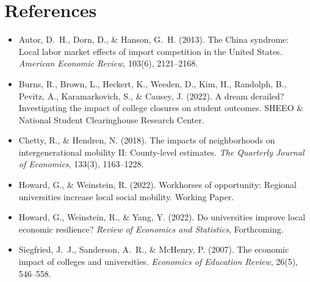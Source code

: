 \documentclass[12pt]{article}
\begin{document}
\section*{References}
\begin{itemize}
\item[] Autor, D.~H., Dorn, D., \& Hanson, G.~H. (2013).
The China syndrome: Local labor market effects of import competition in the United States.
\textit{American Economic Review}, 103(6), 2121--2168.

\item[] Burns, R., Brown, L., Heckert, K., Weeden, D., Kim, H., Randolph, B., Pevitz, A., Karamarkovich, S., \& Causey, J. (2022).
A dream derailed? Investigating the impact of college closures on student outcomes.
SHEEO \& National Student Clearinghouse Research Center.

\item[] Chetty, R., \& Hendren, N. (2018).
The impacts of neighborhoods on intergenerational mobility II: County-level estimates.
\textit{The Quarterly Journal of Economics}, 133(3), 1163--1228.

\item[] Howard, G., \& Weinstein, R. (2022).
Workhorses of opportunity: Regional universities increase local social mobility.
Working Paper.

\item[] Howard, G., Weinstein, R., \& Yang, Y. (2022).
Do universities improve local economic resilience?
\textit{Review of Economics and Statistics}, Forthcoming.

\item[] Siegfried, J.~J., Sanderson, A.~R., \& McHenry, P. (2007).
The economic impact of colleges and universities.
\textit{Economics of Education Review}, 26(5), 546--558.
\end{itemize}
\end{document}
